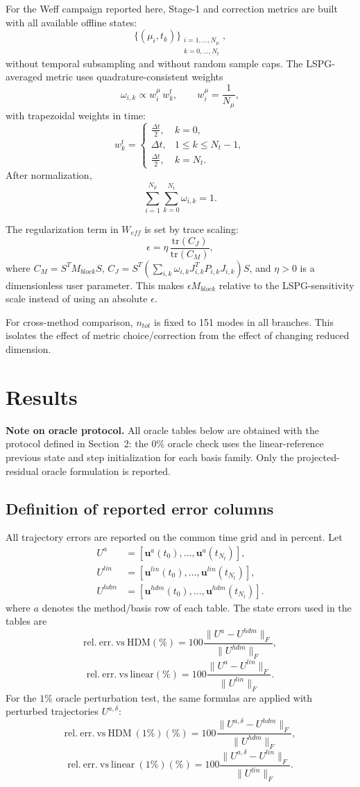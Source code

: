 \documentclass[11pt]{article}
\begin{document}
For the Weff campaign reported here, Stage-1 and correction metrics are built with all available offline states:
\[
\{(\mu_i,t_k)\}_{\substack{i=1,\dots,N_\mu\\k=0,\dots,N_t}},
\]
without temporal subsampling and without random sample caps.
The LSPG-averaged metric uses quadrature-consistent weights
\[
\omega_{i,k}
\propto
w_i^\mu\,w_k^t,
\qquad
w_i^\mu=\frac{1}{N_\mu},
\]
with trapezoidal weights in time:
\[
w_k^t=
\begin{cases}
\frac{\Delta t}{2}, & k=0,\\[2pt]
\Delta t, & 1\le k\le N_t-1,\\[2pt]
\frac{\Delta t}{2}, & k=N_t.
\end{cases}
\]
After normalization,
\[
\sum_{i=1}^{N_\mu}\sum_{k=0}^{N_t}\omega_{i,k}=1.
\]

The regularization term in \(W_{eff}\) is set by trace scaling:
\[
\epsilon=\eta\,\frac{\mathrm{tr}(C_J)}{\mathrm{tr}(C_M)},
\]
where \(C_M=S^TM_{block}S\), \(C_J=S^T\!\left(\sum_{i,k}\omega_{i,k}J_{i,k}^TP_{i,k}J_{i,k}\right)\!S\), and \(\eta>0\) is a dimensionless user parameter.
This makes \(\epsilon M_{block}\) relative to the LSPG-sensitivity scale instead of using an absolute \(\epsilon\).

For cross-method comparison, \(n_{tot}\) is fixed to 151 modes in all branches.
This isolates the effect of metric choice/correction from the effect of changing reduced dimension.

\section{Results}
\noindent
\textbf{Note on oracle protocol.}
All oracle tables below are obtained with the protocol defined in Section~2: the \(0\%\) oracle check uses the linear-reference previous state and step initialization for each basis family.
Only the projected-residual oracle formulation is reported.

\subsection*{Definition of reported error columns}
All trajectory errors are reported on the common time grid and in percent. Let
\begin{align*}
U^{a} &=
[\mathbf u^{a}(t_0),\ldots,\mathbf u^{a}(t_{N_t})],\\
U^{lin} &=
[\mathbf u^{lin}(t_0),\ldots,\mathbf u^{lin}(t_{N_t})],\\
U^{hdm} &=
[\mathbf u^{hdm}(t_0),\ldots,\mathbf u^{hdm}(t_{N_t})].
\end{align*}
where \(a\) denotes the method/basis row of each table.
The state errors used in the tables are
\[
\mathrm{rel.\ err.\ vs\ HDM}(\%)
=
100\frac{\|U^{a}-U^{hdm}\|_F}{\|U^{hdm}\|_F},
\]
\[
\mathrm{rel.\ err.\ vs\ linear}(\%)
=
100\frac{\|U^{a}-U^{lin}\|_F}{\|U^{lin}\|_F}.
\]
For the \(1\%\) oracle perturbation test, the same formulas are applied with perturbed trajectories \(U^{a,\delta}\):
\[
\mathrm{rel.\ err.\ vs\ HDM\ (1\%)}(\%)
=
100\frac{\|U^{a,\delta}-U^{hdm}\|_F}{\|U^{hdm}\|_F},
\]
\[
\mathrm{rel.\ err.\ vs\ linear\ (1\%)}(\%)
=
100\frac{\|U^{a,\delta}-U^{lin}\|_F}{\|U^{lin}\|_F}.
\]
\end{document}

